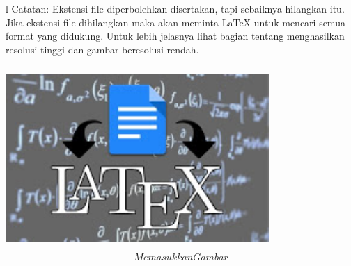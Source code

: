 \vspace{12pt}l
\vspace{12pt}
\noindent
Catatan: Ekstensi file diperbolehkan disertakan, tapi sebaiknya hilangkan itu. Jika ekstensi file dihilangkan maka akan meminta LaTeX untuk mencari semua format yang didukung. Untuk lebih jelasnya lihat bagian tentang menghasilkan resolusi tinggi dan gambar beresolusi rendah. \par
\vspace{12pt}
\vspace{12pt}
\noindent

\includegraphics[width=10cm,height=7cm]{gambar/dapi14.jpg}
\begin{equation}Memasukkan Gambar \end{equation}


